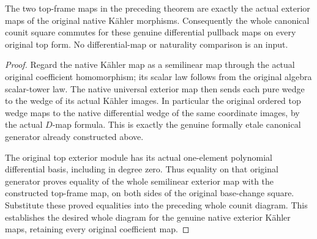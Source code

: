 \begin{theorem}
\label{thm:kn-nadel-etale-exterior-counit-square}
\leanok
The two top-frame maps in the preceding theorem are exactly the
actual exterior maps of the original native K\"ahler morphisms.
Consequently the whole canonical counit square commutes for these
genuine differential pullback maps on every original top form.
No differential-map or naturality comparison is an input.
\end{theorem}
\begin{proof}
Regard the native K\"ahler map as a semilinear map through the actual
original coefficient homomorphism; its scalar law follows from
the original algebra scalar-tower law.  The native universal
exterior map then sends each pure wedge to the wedge of its
actual K\"ahler images.  In particular the original ordered top
wedge maps to the native differential wedge of the same coordinate
images, by the actual $D$-map formula.  This is exactly the genuine
formally etale canonical generator already constructed above.

The original top exterior module has its actual one-element
polynomial differential basis, including in degree zero.  Thus
equality on that original generator proves equality of the whole
semilinear exterior map with the constructed top-frame map, on
both sides of the original base-change square.  Substitute these
proved equalities into the preceding whole counit diagram.  This
establishes the desired whole diagram for the genuine native
exterior K\"ahler maps, retaining every original coefficient map.
\end{proof}
